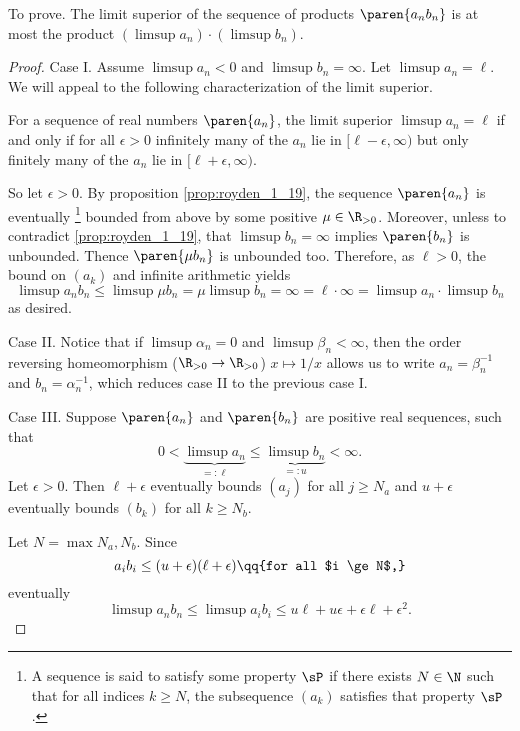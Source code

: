 \documentclass[onesided]{ccg-pset}
\begin{document}
\begin{enumerate}
To prove. The limit superior of the sequence of products $\paren{a_n b_n}$ is at most the product $(\limsup a_n)\cdot(\limsup b_n)$.

\begin{proof}
Case I. Assume $\limsup a_n < 0$ and $\limsup b_n = \infty$. Let $\limsup a_n = \ell$. We will appeal to the following characterization of the limit superior.

\begin{prop}
    \label{prop:royden_1_19}
    For a sequence of real numbers $\paren{a_n}$, the limit superior $\limsup a_n = \ell$ if and only if for all $\epsilon > 0$ infinitely many of the $a_n$ lie in $[\ell - \epsilon, \infty)$ but only finitely many of the $a_n$ lie in $[\ell + \epsilon, \infty)$.
\end{prop}

    So let $\epsilon > 0$.  By proposition \ref{prop:royden_1_19}, the sequence $\paren{a_n}$ is eventually%
    \footnote{%
A sequence is said to  satisfy some property $\sP$ if there exists $N \in \N$ such that for all indices $k \ge N$, the subsequence $(a_k)$ satisfies that property $\sP$.%
    }%
    bounded from above by some positive $\mu \in \R_{>0}$. Moreover, unless to contradict \ref{prop:royden_1_19}, that $\limsup b_n = \infty$ implies $\paren{b_n}$ is unbounded. Thence $\paren{\mu b_n}$ is unbounded too. Therefore, as $\ell > 0$, the bound on $(a_k)$ and infinite arithmetic yields
    \begin{equation*}
        \limsup a_nb_n \le \limsup \mu b_n = \mu \limsup b_n = \infty = \ell \cdot \infty = \limsup a_n \cdot \limsup b_n
    \end{equation*}
    as desired.

    Case II. Notice that if $\limsup \alpha_n = 0$ and $\limsup \beta_n < \infty$, then the order reversing homeomorphism ($\R_{>0} \to \R_{>0}$) $x \mapsto 1/x$ allows us to write $a_n = \beta_n^{-1}$ and $b_n= \alpha_n^{-1}$, which reduces case II to the previous case I.

Case III.  Suppose $\paren{a_n}$ and $\paren{b_n}$ are positive real sequences, such that 
\begin{equation*}
    0 < \underbrace{\limsup a_n}_{=:\ell} \le \underbrace{\limsup b_n}_{=:u} < \infty.
\end{equation*}
Let $\epsilon > 0$. Then $\ell + \epsilon$ eventually bounds $(a_j)$ for all $j \ge N_a$ and $u + \epsilon$ eventually bounds $(b_k)$ for all $k \ge N_b$. 

    Let $N = \max{N_a, N_b}$. Since 
\begin{equation*}
    a_i b_i \le (u + \epsilon)(\ell + \epsilon) \qq{for all $i \ge N$,}
\end{equation*}
eventually
\begin{equation*}
\limsup a_n b_n \le \limsup a_i b_i \le u\ell + u\epsilon + \epsilon\ell + \epsilon^2.
\end{equation*}


\end{proof}
\end{enumerate}
\end{document}

